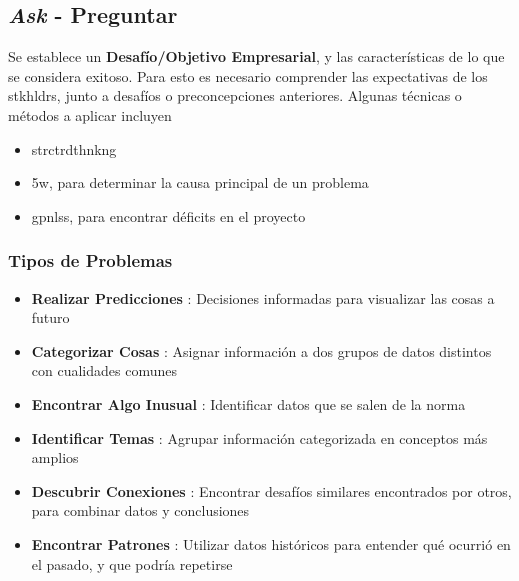 
\subsection{\textit{Ask} - Preguntar}
Se establece un \textbf{Desafío/Objetivo Empresarial}, y las características de lo que se considera exitoso. Para esto es necesario comprender las expectativas de los \gls{stkhldrs}, junto a desafíos o preconcepciones anteriores. Algunas técnicas o métodos a aplicar incluyen
\begin{itemize}
    \item {\gls{strctrdthnkng}}
    \item {\gls{5w}, para determinar la causa principal de un problema}
    \item {\gls{gpnlss}, para encontrar déficits en el proyecto}
\end{itemize}

\subsubsection{Tipos de Problemas}
\begin{itemize}
    \item {\textbf{Realizar Predicciones} : Decisiones informadas para visualizar las cosas a futuro}
    \item {\textbf{Categorizar Cosas} : Asignar información a dos grupos de datos distintos con cualidades comunes}
    \item {\textbf{Encontrar Algo Inusual} : Identificar datos que se salen de la norma}
    \item {\textbf{Identificar Temas} : Agrupar información categorizada en conceptos más amplios}
    \item {\textbf{Descubrir Conexiones} : Encontrar desafíos similares encontrados por otros, para combinar datos y conclusiones}
    \item {\textbf{Encontrar Patrones} : Utilizar datos históricos para entender qué ocurrió en el pasado, y que podría repetirse}
\end{itemize}


